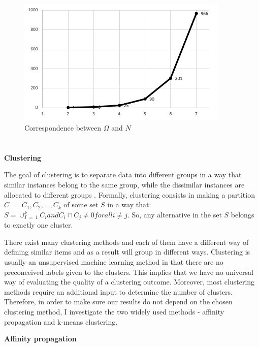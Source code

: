 \documentclass[a4paper,12pt]{article}
\begin{document}
\begin{figure}[H]
    \centering
    \includegraphics[width=0.9\textwidth]{staticFiles/compromiseComparisonsZakAppendix.png}
    \caption{Correspondence between $\Omega$ and $N$}
    \label{fig:compromiseComparisonPlot}
\end{figure}

\newpage
\section{}\label{appendix:clusteringAlgorithms}

\textbf{Clustering}

The goal of clustering is to separate data into different groups in a way that similar instances belong to the same group, while the dissimilar instances are allocated to different groups \citep{maimon2005data}. Formally, clustering consists in making a partition $C\ =\ {C_1,C_2,\ldots,C_k}$ of some set $S$ in a way that: $S=\cup_{I\ =\ 1}^kC_i and C_i\cap C_j\neq0 for all i\neq j$. So, any alternative in the set $S$ belongs to exactly one cluster.

There exist many clustering methods and each of them have a different way of defining similar items and as a result will group in different ways. Clustering is usually an unsupervised machine learning method in that there are no preconceived labels given to the clusters. This implies that we have no universal way of evaluating the quality of a clustering outcome. Moreover, most clustering methods require an additional input to determine the number of clusters.  Therefore, in order to make sure our results do not depend on the chosen clustering method, I investigate the two widely used methods - affinity propagation and k-means clustering.

\textbf{Affinity propagation}
\end{document}
